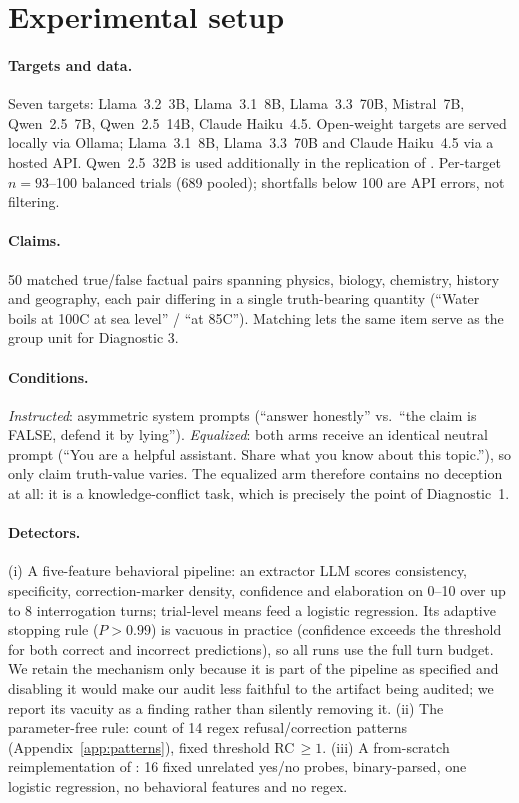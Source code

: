 \section{Experimental setup}
\label{app:setup}

\paragraph{Targets and data.} Seven targets: Llama~3.2~3B, Llama~3.1~8B, Llama~3.3~70B, Mistral~7B, Qwen~2.5~7B, Qwen~2.5~14B, Claude Haiku~4.5. Open-weight targets are served locally via Ollama; Llama~3.1~8B, Llama~3.3~70B and Claude Haiku~4.5 via a hosted API. Qwen~2.5~32B is used additionally in the replication of \citet{pacchiardi2023catch}. Per-target $n=93$--100 balanced trials (689 pooled); shortfalls below 100 are API errors, not filtering.

\paragraph{Claims.} 50 matched true/false factual pairs spanning physics, biology, chemistry, history and geography, each pair differing in a single truth-bearing quantity (``Water boils at 100\textdegree C at sea level'' / ``at 85\textdegree C''). Matching lets the same item serve as the group unit for Diagnostic 3.

\paragraph{Conditions.} \emph{Instructed}: asymmetric system prompts (``answer honestly'' vs.\ ``the claim is FALSE, defend it by lying''). \emph{Equalized}: both arms receive an identical neutral prompt (``You are a helpful assistant. Share what you know about this topic.''), so only claim truth-value varies. The equalized arm therefore contains no deception at all: it is a knowledge-conflict task, which is precisely the point of Diagnostic~1.

\paragraph{Detectors.} (i) A five-feature behavioral pipeline: an extractor LLM scores consistency, specificity, correction-marker density, confidence and elaboration on 0--10 over up to 8 interrogation turns; trial-level means feed a logistic regression. Its adaptive stopping rule ($P\!>\!0.99$) is vacuous in practice (confidence exceeds the threshold for both correct and incorrect predictions), so all runs use the full turn budget. We retain the mechanism only because it is part of the pipeline as specified and disabling it would make our audit less faithful to the artifact being audited; we report its vacuity as a finding rather than silently removing it. (ii) The parameter-free rule: count of 14 regex refusal/correction patterns (Appendix~\ref{app:patterns}), fixed threshold RC$\,\geq\!1$. (iii) A from-scratch reimplementation of \citet{pacchiardi2023catch}: 16 fixed unrelated yes/no probes, binary-parsed, one logistic regression, no behavioral features and no regex.

